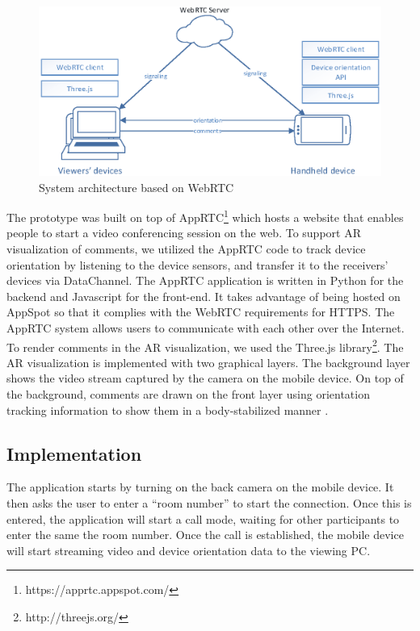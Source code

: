 \begin{figure}[ht]
  \centering
  \includegraphics[width=\linewidth]{images/mgia16/system}
  \caption{System architecture based on WebRTC}
	\label{fig:mgia16:system}
\end{figure}

The prototype was built on top of AppRTC\footnote{https://apprtc.appspot.com/} which hosts a website that enables people to start a video conferencing session on the web. To support AR visualization of comments, we utilized the AppRTC code to track device orientation by listening to the device sensors, and transfer it to the receivers’ devices via DataChannel. The AppRTC application is written in Python for the backend and Javascript for the front-end. It takes advantage of being hosted on AppSpot so that it complies with the WebRTC requirements for HTTPS. The AppRTC system allows users to communicate with each other over the Internet. To render comments in the AR visualization, we used the Three.js library\footnote{http://threejs.org/}. The AR visualization is implemented with two graphical layers. The background layer shows the video stream captured by the camera on the mobile device. On top of the background, comments are drawn on the front layer using orientation tracking information to show them in a body-stabilized manner \cite{Billinghurst1998}. 

\subsection{Implementation}

The application starts by turning on the back camera on the mobile device. It then asks the user to enter a “room number” to start the connection. Once this is entered, the application will start a call mode, waiting for other participants to enter the same the room number. Once the call is established, the mobile device will start streaming video and device orientation data to the viewing PC. 

